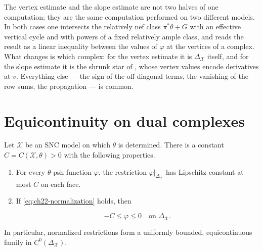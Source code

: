 \begin{remark}
\label{rem:ch22-estimates-together}
The vertex estimate and the slope estimate are not two halves of one
computation; they are the same computation performed on two different
models.  In both cases one intersects the relatively nef class
$\pi^*\theta+G$ with an effective vertical cycle and with powers of a
fixed relatively ample class, and reads the result as a linear inequality
between the values of $\varphi$ at the vertices of a complex.  What
changes is which complex: for the vertex estimate it is
$\Delta_{\mathcal X}$ itself, and for the slope estimate it is the shrunk
star of , whose vertex values encode
derivatives at $v$.  Everything else --- the sign of the off-diagonal
terms, the vanishing of the row sums, the propagation --- is common.
\end{remark}

\section{Equicontinuity on dual complexes}
\label{sec:ch22-equicontinuity}

\begin{theorem}\label{thm:bfj-skeletal-equicontinuity}
Let $\mathcal X$ be an SNC model on which $\theta$ is determined.  There
is a constant $C=C(\mathcal X,\theta)>0$ with the following properties.

\begin{enumerate}
\item For every $\theta$-psh function $\varphi$, the restriction
$\varphi|_{\Delta_{\mathcal X}}$ has Lipschitz constant at most $C$ on
each face.
\item If \eqref{eq:ch22-normalization} holds, then

\[
                  -C\leq\varphi\leq0
                  \quad\text{on }\Delta_{\mathcal X}.
\tag{22.52}\label{eq:ch22-skeletal-bound}
\]
\end{enumerate}

In particular, normalized restrictions form a uniformly bounded,
equicontinuous family in $C^0(\Delta_{\mathcal X})$.
\end{theorem}

